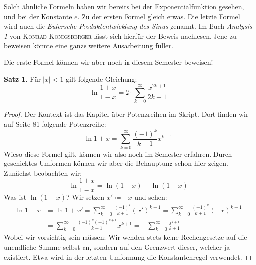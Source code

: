 \documentclass[10pt,fleqn]{article}
\theoremstyle{definition}
\newtheorem{theorem}{Satz}
\theoremstyle{remark}
\begin{document}
Solch ähnliche Formeln haben wir bereits bei der Exponentialfunktion gesehen, und bei der Konstante \(e\). Zu der ersten Formel gleich etwas. Die letzte Formel wird auch die \emph{Eulersche Produktentwicklung des Sinus} genannt. Im Buch \emph{Analysis 1} von \textsc{Konrad Königsberger} lässt sich hierfür der Beweis nachlesen. Jene zu beweisen könnte eine ganze weitere Ausarbeitung füllen.

Die erste Formel können wir aber noch in diesem Semester beweisen!
\begin{theorem} Für \(|x| < 1\) gilt folgende Gleichung:
    \[
        \ln{\frac{1+x}{1-x}} = 2 \cdot \sum_{k=0}^{\infty} \frac{x^{2k+1}}{2k+1}
    \]
\end{theorem}
\begin{proof}
    Der Kontext ist das Kapitel über Potenzreihen im Skript. Dort finden wir auf Seite 81 folgende Potenzreihe:
    \[
        \ln{1+x} = \sum_{k=0}^{\infty} \frac{(-1)^{k}}{k+1} x^{k+1}
    \]
    Wieso diese Formel gilt, können wir also noch im Semester erfahren. Durch geschicktes Umformen können wir aber die Behauptung schon hier zeigen. Zunächst beobachten wir:
    \[
        \ln{\frac{1+x}{1-x}} = \ln{(1+x)} - \ln{(1-x)}
    \]
    Was ist \(\ln{(1-x)}\)? Wir setzen \(x' \coloneqq -x\) und sehen:
    \begin{align*}
        \ln{1-x} &= \ln{1+x'} = \sum_{k=0}^{\infty} \frac{(-1)^{k}}{k+1} (x')^{k+1} = \sum_{k=0}^{\infty} \frac{(-1)^{k}}{k+1} (-x)^{k+1}\\
        &= \sum_{k=0}^{\infty} \frac{(-1)^{k} (-1)^{k+1}}{k+1} x^{k+1} = -\sum_{k=0}^{\infty} \frac{x^{k+1}}{k+1}
    \end{align*}
    Wobei wir vorsichtig sein müssen: Wir wenden stets keine Rechengesetze auf die unendliche Summe selbst an, sondern auf den Grenzwert dieser, welcher ja existiert. Etwa wird in der letzten Umformung die Konstantenregel verwendet.


\end{proof}
\end{document}
